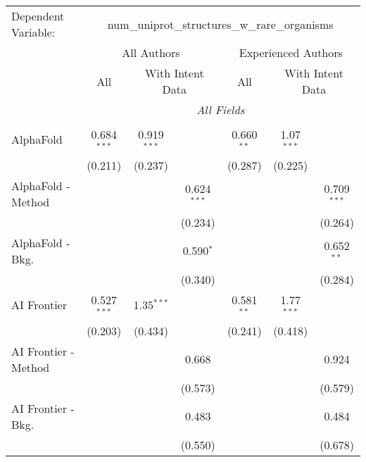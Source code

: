 \begingroup
\centering
\begin{tabular}{lcccccc}
   \tabularnewline \midrule \midrule
   Dependent Variable: & \multicolumn{6}{c}{num\_uniprot\_structures\_w\_rare\_organisms}\\
 & \multicolumn{3}{c}{All Authors} & \multicolumn{3}{c}{Experienced Authors} \\
\cmidrule(lr){2-4} \cmidrule(lr){5-7}
 & \multicolumn{1}{c}{All} & \multicolumn{2}{c}{With Intent Data} & \multicolumn{1}{c}{All} & \multicolumn{2}{c}{With Intent Data} \\
\cmidrule(lr){2-2} \cmidrule(lr){3-4} \cmidrule(lr){5-5} \cmidrule(lr){6-7}
 & \multicolumn{6}{c}{\textit{All Fields}} \\ \\
   AlphaFold            & 0.684$^{***}$ & 0.919$^{***}$ &               & 0.660$^{**}$ & 1.07$^{***}$ &   \\   
                        & (0.211)       & (0.237)       &               & (0.287)      & (0.225)      &   \\   
   AlphaFold - Method   &               &               & 0.624$^{***}$ &              &              & 0.709$^{***}$\\   
                        &               &               & (0.234)       &              &              & (0.264)\\   
   AlphaFold - Bkg.     &               &               & 0.590$^{*}$   &              &              & 0.652$^{**}$\\   
                        &               &               & (0.340)       &              &              & (0.284)\\   
   AI Frontier          & 0.527$^{***}$ & 1.35$^{***}$  &               & 0.581$^{**}$ & 1.77$^{***}$ &   \\   
                        & (0.203)       & (0.434)       &               & (0.241)      & (0.418)      &   \\   
   AI Frontier - Method &               &               & 0.668         &              &              & 0.924\\   
                        &               &               & (0.573)       &              &              & (0.579)\\   
   AI Frontier - Bkg.   &               &               & 0.483         &              &              & 0.484\\   
                        &               &               & (0.550)       &              &              & (0.678)\\   

\end{tabular}
